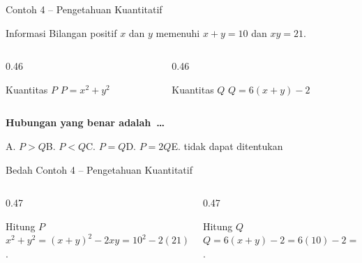 \begin{frame}[shrink=4]{Contoh 4 -- Pengetahuan Kuantitatif}
  \begin{block}{Informasi}
    Bilangan positif $x$ dan $y$ memenuhi $x+y=10$ dan $xy=21$.
  \end{block}
  \begin{columns}[T,onlytextwidth]
    \begin{column}{0.46\textwidth}
      \begin{block}{Kuantitas $P$}
        \centering $P=x^2+y^2$
      \end{block}
    \end{column}
    \begin{column}{0.46\textwidth}
      \begin{block}{Kuantitas $Q$}
        \centering $Q=6(x+y)-2$
      \end{block}
    \end{column}
  \end{columns}
  {\bfseries Hubungan yang benar adalah~\ldots}\par\vspace{0.09cm}
  {\fontsize{10.3}{12.8}\selectfont
  A. $P>Q$\quad B. $P<Q$\quad C. $P=Q$\quad D. $P=2Q$\quad E. tidak dapat ditentukan}
\end{frame}

\begin{frame}{Bedah Contoh 4 -- Pengetahuan Kuantitatif}
  \vspace{0.18cm}
  \begin{columns}[T,onlytextwidth]
    \begin{column}{0.47\textwidth}
      \begin{block}{Hitung $P$}
        $x^2+y^2=(x+y)^2-2xy=10^2-2(21)=58$.
      \end{block}
    \end{column}
    \begin{column}{0.47\textwidth}
      \begin{block}{Hitung $Q$}
        $Q=6(x+y)-2=6(10)-2=58$.
      \end{block}
    \end{column}
  \end{columns}
  {\fontsize{10.6}{13.2}\selectfont
  \par\vspace{0.14cm}
  }
\end{frame}

